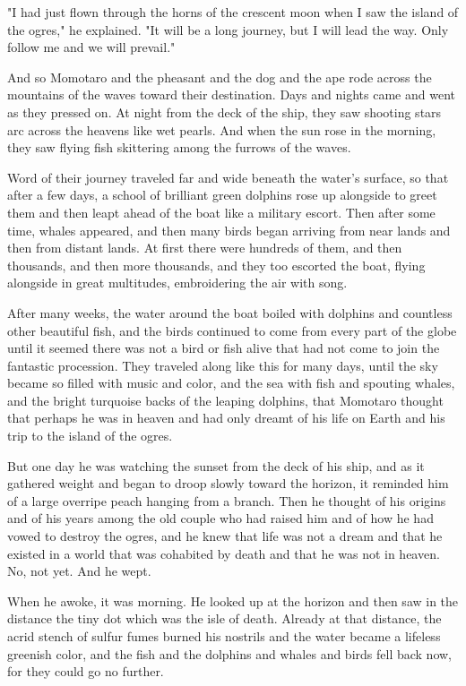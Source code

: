 "I had just flown through the horns of the crescent moon when I saw the island of the ogres," he explained. "It will be a long journey, but I will lead the way. Only follow me and we will prevail."

And so Momotaro and the pheasant and the dog and the ape rode across the mountains of the waves toward their destination. Days and nights came and went as they pressed on. At night from the deck of the ship, they saw shooting stars arc across the heavens like wet pearls. And when the sun rose in the morning, they saw flying fish skittering among the furrows of the waves.

Word of their journey traveled far and wide beneath the water's surface, so that after a few days, a school of brilliant green dolphins rose up alongside to greet them and then leapt ahead of the boat like a military escort. Then after some time, whales appeared, and then many birds began arriving from near lands and then from distant lands. At first there were hundreds of them, and then thousands, and then more thousands, and they too escorted the boat, flying alongside in great multitudes, embroidering the air with song.

After many weeks, the water around the boat boiled with dolphins and countless other beautiful fish, and the birds continued to come from every part of the globe until it seemed there was not a bird or fish alive that had not come to join the fantastic procession. They traveled along like this for many days, until the sky became so filled with music and color, and the sea with fish and spouting whales, and the bright turquoise backs of the leaping dolphins, that Momotaro thought that perhaps he was in heaven and had only dreamt of his life on Earth and his trip to the island of the ogres.

But one day he was watching the sunset from the deck of his ship, and as it gathered weight and began to droop slowly toward the horizon, it reminded him of a large overripe peach hanging from a branch. Then he thought of his origins and of his years among the old couple who had raised him and of how he had vowed to destroy the ogres, and he knew that life was not a dream and that he existed in a world that was cohabited by death and that he was not in heaven. No, not yet. And he wept.

When he awoke, it was morning. He looked up at the horizon and then saw in the distance the tiny dot which was the isle of death. Already at that distance, the acrid stench of sulfur fumes burned his nostrils and the water became a lifeless greenish color, and the fish and the dolphins and whales and birds fell back now, for they could go no further.

